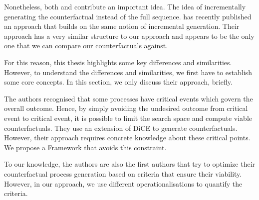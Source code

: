 \documentclass[./../../paper.tex]{subfiles}
\begin{document}
Nonetheless, both \citeauthor{tsirtsis_CounterfactualExplanationsSequential_2021} and \citeauthor{oberst_CounterfactualOffPolicyEvaluation_2019} contribute an important idea. The idea of incrementally generating the counterfactual instead of the full sequence. \citeauthor{hsieh_DiCE4ELInterpretingProcess_2021} has recently published an approach that builds on the same notion of incremental generation. Their approach has a very similar structure to our approach and appears to be the only one that we can compare our counterfactuals against. 

For this reason, this thesis highlights some key differences and similarities. However, to understand the differences and similarities, we first have to establish some core concepts.  In this section, we only discuss their approach, briefly.

The authors recognised that some processes have critical events which govern the overall outcome. Hence, by simply avoiding the undesired outcome from critical event to critical event, it is possible to limit the search space and compute viable counterfactuals. They use an extension of DiCE\autocite{mothilal_ExplainingMachineLearning_2020} to generate counterfactuals. However, their approach requires concrete knowledge about these critical points. We propose a Framework that avoids this constraint. 

To our knowledge, the authors are also the first authors that try to optimize their counterfactual process generation based on criteria that ensure their viability. However, in our approach, we use different operationalisations to quantify the criteria.






\end{document}
